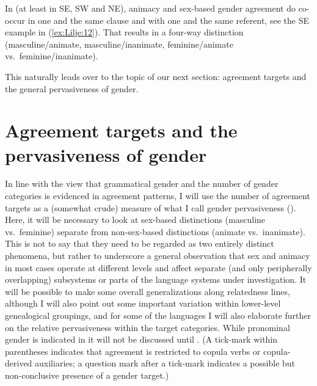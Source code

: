\documentclass[output=collectionpaper]{langsci/langscibook}
\begin{document}
In  (at least in SE, SW and NE), animacy and sex-based gender agreement do co-occur in one and the same clause and with one and the same referent, see the SE  example in (\ref{ex:Lilje:12}). That results in a four-way distinction (masculine/animate, masculine/inanimate, feminine/animate vs.\ feminine/inanimate).

This naturally leads over to the topic of our next section: agreement targets and the general pervasiveness of gender.

\section{Agreement targets and the pervasiveness of gender}

In line with the view that grammatical gender and the number of gender categories is evidenced in agreement patterns, I will use the number of agreement targets as a (somewhat crude) measure of what I call gender pervasiveness (). Here, it will be necessary to look at sex-based distinctions (masculine vs.\ feminine) separate from non-sex-based distinctions (animate vs.\ inanimate). This is not to say that they need to be regarded as two entirely distinct phenomena, but rather to underscore a general observation that sex and animacy in most cases operate at different levels and affect separate (and only peripherally overlapping) subsystems or parts of the language systems under investigation. It will be possible to make some overall generalizations along relatedness lines, although I will also point out some important variation within lower-level genealogical groupings, and for some of the languages I will also elaborate further on the relative pervasiveness within the target categories. While pronominal gender is indicated in  it will not be discussed until . (A tick-mark within parentheses indicates that agreement is restricted to copula verbs or copula-derived auxiliaries; a question mark after a tick-mark indicates a possible but non-conclusive presence of a gender target.)
\end{document}
